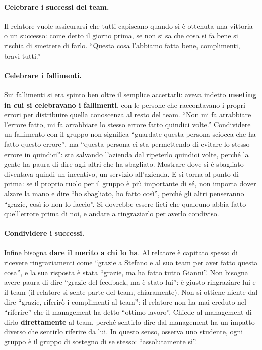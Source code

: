 \paragraph{Celebrare i successi del team.} Il relatore vuole assicurarsi che tutti capiscano quando si è
ottenuta una vittoria o un successo: come detto il giorno prima, se non si sa che cosa si fa bene si
rischia di smettere di farlo. ``Questa cosa l'abbiamo fatta bene, complimenti, bravi tutti.''

\paragraph{Celebrare i fallimenti.} Sui fallimenti si era spinto ben oltre il semplice accettarli: aveva
indetto \textbf{meeting in cui si celebravano i fallimenti}, con le persone che raccontavano i propri errori
per distribuire quella conoscenza al resto del team. ``Non mi fa arrabbiare l'errore fatto, mi fa arrabbiare
lo stesso errore fatto quindici volte.'' Condividere un fallimento con il gruppo non significa ``guardate
questa persona sciocca che ha fatto questo errore'', ma ``questa persona ci sta permettendo di evitare lo
stesso errore in quindici'': sta salvando l'azienda dal ripeterlo quindici volte, perché la gente ha paura di
dire agli altri che ha sbagliato. Mostrare dove si è sbagliato diventava quindi un incentivo, un servizio
all'azienda. E si torna al punto di prima: se il proprio ruolo per il gruppo è più importante di sé, non
importa dover alzare la mano e dire ``ho sbagliato, ho fatto così'', perché gli altri penseranno ``grazie,
così io non lo faccio''. Si dovrebbe essere lieti che qualcuno abbia fatto quell'errore prima di noi, e
andare a ringraziarlo per averlo condiviso.

\paragraph{Condividere i successi.} Infine bisogna \textbf{dare il merito a chi lo ha}. Al relatore è
capitato spesso di ricevere ringraziamenti come ``grazie a Stefano e al suo team per aver fatto questa
cosa'', e la sua risposta è stata ``grazie, ma ha fatto tutto Gianni''. Non bisogna avere paura di dire
``grazie del feedback, ma è stato lui'': è giusto ringraziare lui e il team (il relatore si sente parte del
team, chiaramente). Non si ottiene niente dal dire ``grazie, riferirò i complimenti al team'': il relatore
non ha mai creduto nel ``riferire'' che il management ha detto ``ottimo lavoro''. Chiede al management di
dirlo \textbf{direttamente} al team, perché sentirlo dire dal management ha un impatto diverso che sentirlo
riferire da lui. In questo senso, osserva uno studente, ogni gruppo è il gruppo di sostegno di se stesso:
``assolutamente sì''.

